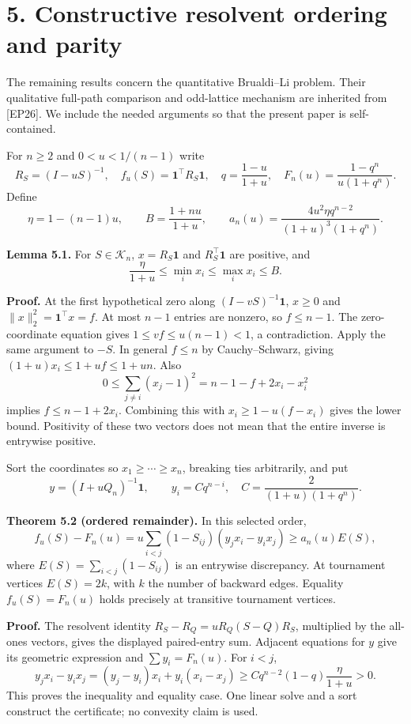 \documentclass[
  11pt,
  a4paper,
]{article}
\begin{document}
\section{5. Constructive resolvent ordering and
parity}\label{constructive-resolvent-ordering-and-parity}

The remaining results concern the quantitative Brualdi--Li problem.
Their qualitative full-path comparison and odd-lattice mechanism are
inherited from {[}EP26{]}. We include the needed arguments so that the
present paper is self-contained.

For \(n\ge2\) and \(0<u<1/(n-1)\) write \[
 R_S=(I-uS)^{-1},\quad f_u(S)=\mathbf1^\top R_S\mathbf1,
 \quad q=\frac{1-u}{1+u},\quad
 F_n(u)=\frac{1-q^n}{u(1+q^n)}.
\] Define \[
 \eta=1-(n-1)u,\qquad B=\frac{1+nu}{1+u},\qquad
 a_n(u)=\frac{4u^2\eta q^{n-2}}{(1+u)^3(1+q^n)}.             \tag{5.1}
\]

\textbf{Lemma 5.1.} For \(S\in\mathcal K_n\), \(x=R_S\mathbf1\) and
\(R_S^\top\mathbf1\) are positive, and
\[\frac{\eta}{1+u}\le\min_i x_i\le\max_i x_i\le B.\]

\textbf{Proof.} At the first hypothetical zero along
\((I-vS)^{-1}\mathbf1\), \(x\ge0\) and \(\|x\|_2^2=\mathbf1^\top x=f\).
At most \(n-1\) entries are nonzero, so \(f\le n-1\). The
zero-coordinate equation gives \(1\le vf\le u(n-1)<1\), a contradiction.
Apply the same argument to \(-S\). In general \(f\le n\) by
Cauchy--Schwarz, giving \((1+u)x_i\le1+uf\le1+un\). Also
\[0\le\sum_{j\ne i}(x_j-1)^2=n-1-f+2x_i-x_i^2\] implies
\(f\le n-1+2x_i\). Combining this with \(x_i\ge1-u(f-x_i)\) gives the
lower bound. Positivity of these two vectors does not mean that the
entire inverse is entrywise positive.

Sort the coordinates so \(x_1\ge\cdots\ge x_n\), breaking ties
arbitrarily, and put \[y=(I+uQ_n)^{-1}\mathbf1,\qquad y_i=Cq^{n-i},\quad
 C=\frac2{(1+u)(1+q^n)}.\]

\textbf{Theorem 5.2 (ordered remainder).} In this selected order, \[
 f_u(S)-F_n(u)=
 u\sum_{i<j}(1-S_{ij})(y_jx_i-y_ix_j)
 \ge a_n(u)E(S),                                           \tag{5.2}
\] where \(E(S)=\sum_{i<j}(1-S_{ij})\) is an entrywise discrepancy. At
tournament vertices \(E(S)=2k\), with \(k\) the number of backward
edges. Equality \(f_u(S)=F_n(u)\) holds precisely at transitive
tournament vertices.

\textbf{Proof.} The resolvent identity \(R_S-R_Q=uR_Q(S-Q)R_S\),
multiplied by the all-ones vectors, gives the displayed paired-entry
sum. Adjacent equations for \(y\) give its geometric expression and
\(\sum y_i=F_n(u)\). For \(i<j\), \[
 y_jx_i-y_ix_j=(y_j-y_i)x_i+y_i(x_i-x_j)
 \ge Cq^{n-2}(1-q)\frac\eta{1+u}>0.
\] This proves the inequality and equality case. One linear solve and a
sort construct the certificate; no convexity claim is used.
\end{document}
